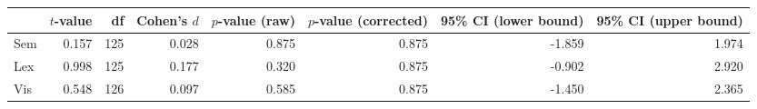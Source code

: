 \begin{tabular}{lrrrrrrr}
\toprule
 & $t$-value & df & Cohen's $d$ & $p$-value (raw) & $p$-value (corrected) & 95\% CI (lower bound) & 95\% CI (upper bound) \\
\midrule
 Sem & 0.157 & 125 & 0.028 & 0.875 & 0.875 & -1.859 & 1.974 \\
 Lex & 0.998 & 125 & 0.177 & 0.320 & 0.875 & -0.902 & 2.920 \\
 Vis & 0.548 & 126 & 0.097 & 0.585 & 0.875 & -1.450 & 2.365 \\
\bottomrule
\end{tabular}